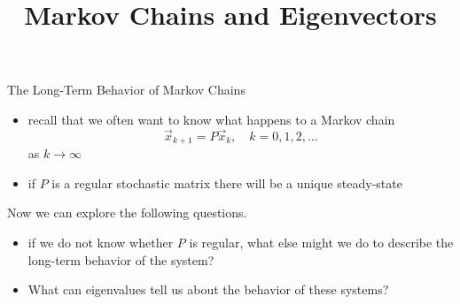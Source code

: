 \title{Markov Chains and Eigenvectors}
\subtitle{\SubTitleName}
\institute[]{\Course}
\author{\Instructor}
\maketitle   





\begin{frame}{The Long-Term Behavior of Markov Chains}

    \begin{itemize}
        \item recall that we often want to know what happens to a Markov chain $$\vec x_{k+1} = P\vec x_k, \quad k = 0, 1, 2, \ldots $$ as $k \rightarrow \infty$
        \item if $P$ is a regular stochastic matrix there will be a unique steady-state
   \end{itemize}

    \vspace{6pt} 
    
    \pause 
    
    Now we can explore the following questions.
    \begin{itemize}
        \item if we do not know whether $P$ is regular, what else might we do to describe the long-term behavior of the system? 
        \item What can eigenvalues tell us about the behavior of these systems?
    \end{itemize}
\end{frame}






